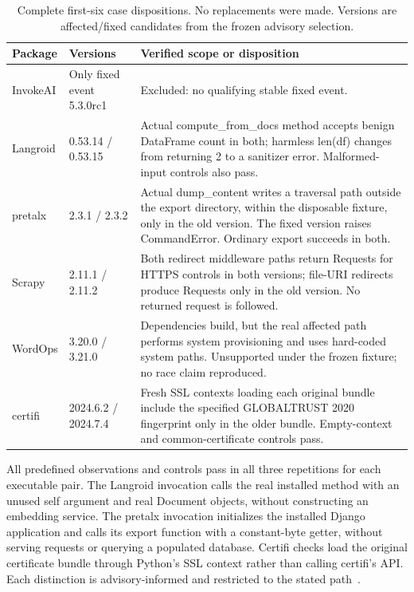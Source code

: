 \documentclass[manuscript,screen,nonacm]{acmart}
\begin{document}
\begin{table}[t]
\caption{Complete first-six case dispositions. No replacements were made. Versions are affected/fixed candidates from the frozen advisory selection.}
\label{tab:public}
\begin{tabularx}{\linewidth}{llX}
\toprule Package & Versions & Verified scope or disposition \\
\midrule
InvokeAI & Only fixed event 5.3.0rc1 & Excluded: no qualifying stable fixed event. \\
Langroid & 0.53.14 / 0.53.15 & Actual compute\_from\_docs method accepts benign DataFrame count in both; harmless len(df) changes from returning 2 to a sanitizer error. Malformed-input controls also pass. \\
pretalx & 2.3.1 / 2.3.2 & Actual dump\_content writes a traversal path outside the export directory, within the disposable fixture, only in the old version. The fixed version raises CommandError. Ordinary export succeeds in both. \\
Scrapy & 2.11.1 / 2.11.2 & Both redirect middleware paths return Requests for HTTPS controls in both versions; file-URI redirects produce Requests only in the old version. No returned request is followed. \\
WordOps & 3.20.0 / 3.21.0 & Dependencies build, but the real affected path performs system provisioning and uses hard-coded system paths. Unsupported under the frozen fixture; no race claim reproduced. \\
certifi & 2024.6.2 / 2024.7.4 & Fresh SSL contexts loading each original bundle include the specified GLOBALTRUST 2020 fingerprint only in the older bundle. Empty-context and common-certificate controls pass. \\
\bottomrule
\end{tabularx}
\end{table}

All predefined observations and controls pass in all three repetitions for each executable pair. The Langroid invocation calls the real installed method with an unused self argument and real Document objects, without constructing an embedding service. The pretalx invocation initializes the installed Django application and calls its export function with a constant-byte getter, without serving requests or querying a populated database. Certifi checks load the original certificate bundle through Python's SSL context rather than calling certifi's API. Each distinction is advisory-informed and restricted to the stated path~\cite{advisories}.
\end{document}
